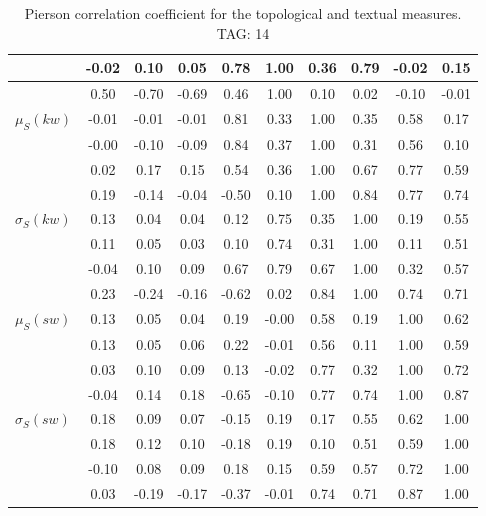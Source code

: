 \begin{table*}[h!]
\begin{center}
\begin{tabular}{| l | c | c | c | c | c | c | c | c | c |}
 & -0.02  & 0.10  & 0.05  & 0.78  & 1.00  & 0.36  & 0.79  & -0.02  & 0.15 \\\hline
 & 0.50  & -0.70  & -0.69  & 0.46  & 1.00  & 0.10  & 0.02  & -0.10  & -0.01 \\\hline
$\mu_S(kw)$ & -0.01  & -0.01  & -0.01  & 0.81  & 0.33  & 1.00  & 0.35  & 0.58  & 0.17 \\\hline
 & -0.00  & -0.10  & -0.09  & 0.84  & 0.37  & 1.00  & 0.31  & 0.56  & 0.10 \\\hline
 & 0.02  & 0.17  & 0.15  & 0.54  & 0.36  & 1.00  & 0.67  & 0.77  & 0.59 \\\hline
 & 0.19  & -0.14  & -0.04  & -0.50  & 0.10  & 1.00  & 0.84  & 0.77  & 0.74 \\\hline
$\sigma_S(kw)$ & 0.13  & 0.04  & 0.04  & 0.12  & 0.75  & 0.35  & 1.00  & 0.19  & 0.55 \\\hline
 & 0.11  & 0.05  & 0.03  & 0.10  & 0.74  & 0.31  & 1.00  & 0.11  & 0.51 \\\hline
 & -0.04  & 0.10  & 0.09  & 0.67  & 0.79  & 0.67  & 1.00  & 0.32  & 0.57 \\\hline
 & 0.23  & -0.24  & -0.16  & -0.62  & 0.02  & 0.84  & 1.00  & 0.74  & 0.71 \\\hline
$\mu_S(sw)$ & 0.13  & 0.05  & 0.04  & 0.19  & -0.00  & 0.58  & 0.19  & 1.00  & 0.62 \\\hline
 & 0.13  & 0.05  & 0.06  & 0.22  & -0.01  & 0.56  & 0.11  & 1.00  & 0.59 \\\hline
 & 0.03  & 0.10  & 0.09  & 0.13  & -0.02  & 0.77  & 0.32  & 1.00  & 0.72 \\\hline
 & -0.04  & 0.14  & 0.18  & -0.65  & -0.10  & 0.77  & 0.74  & 1.00  & 0.87 \\\hline
$\sigma_S(sw)$ & 0.18  & 0.09  & 0.07  & -0.15  & 0.19  & 0.17  & 0.55  & 0.62  & 1.00 \\\hline
 & 0.18  & 0.12  & 0.10  & -0.18  & 0.19  & 0.10  & 0.51  & 0.59  & 1.00 \\\hline
 & -0.10  & 0.08  & 0.09  & 0.18  & 0.15  & 0.59  & 0.57  & 0.72  & 1.00 \\\hline
 & 0.03  & -0.19  & -0.17  & -0.37  & -0.01  & 0.74  & 0.71  & 0.87  & 1.00 \\\hline
\end{tabular}
\caption{Pierson correlation coefficient for the topological and textual measures. TAG: 14}
\end{center}
\end{table*}